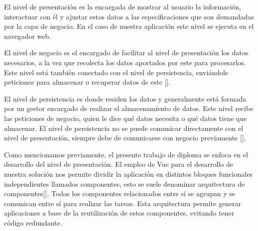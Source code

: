 El nivel de presentación es la encargada de mostrar al usuario la información, interactuar con él y ajustar estos datos a las especificaciones que son demandadas por la capa de negocio. En el caso de nuestra aplicación este nivel se ejecuta en el navegador web. 

El nivel de negocio es el encargado de facilitar al nivel de presentación los datos necesarios, a la vez que recolecta los datos aportados por este para procesarlos. Este nivel está también conectado con el nivel de persistencia, enviándole peticiones para almacenar o recuperar datos de este [\cite{96}].

El nivel de persistencia es donde residen los datos y generalmente está formada por un gestor encargado de realizar el almacenamiento de datos. Este nivel recibe las peticiones de negocio, quien le dice qué datos necesita o qué datos tiene que almacenar. El nivel de persistencia no se puede comunicar directamente con el nivel de presentación, siempre debe de comunicarse con negocio previamente [\cite{96}]. 

%

Como mencionamos previamente, el presente trabajo de diploma se enfoca en el desarrollo del nivel de presentación. El empleo de Vue para el desarrollo de nuestra solución nos permite dividir la aplicación en distintos bloques funcionales independientes llamados componentes, esto se suele denominar arquitectura de componentes[\cite{50}]. Todos los componentes relacionados entre sí se agrupan y se comunican entre sí para realizar las tareas. Esta arquitectura permite generar aplicaciones a base de la reutilización de estos componentes, evitando tener código redundante.


